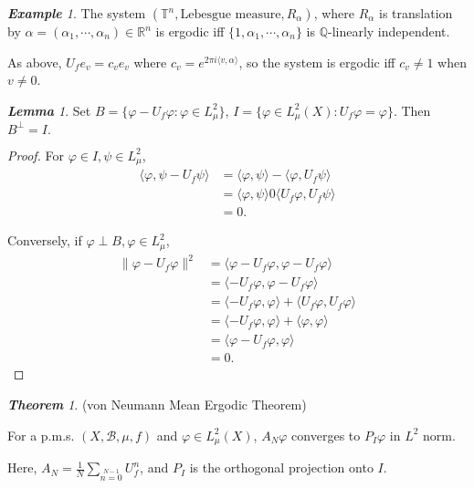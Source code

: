 \documentclass[10pt, a4paper, oneside]{report}
\numberwithin{equation}{chapter}
\theoremstyle{remark}
\newtheorem{theorem}[definition]{\bf{Theorem}}
\newtheorem{lemma}[definition]{\bf{Lemma}}
\theoremstyle{remark}
\newtheorem{example}{\bf{Example}}[chapter]
\begin{document}
\begin{example}
    The system $(\mathbb{T}^n,\text{Lebesgue measure},R_\alpha)$, where $R_\alpha$ is translation by $\alpha=(\alpha_1,\cdots,\alpha_n)\in\mathbb{R}^n$ is ergodic iff $\{1,\alpha_1,\cdots,\alpha_n\}$ is $\mathbb{Q}$-linearly independent.

    As above, $U_fe_v=c_ve_v$ where $c_v=e^{2\pi i\langle v,\alpha\rangle}$, so the system is ergodic iff $c_v\not=1$ when $v\not=0$.
\end{example}

\begin{lemma}
    Set $B=\{\varphi-U_f\varphi:\varphi\in L_\mu^2\}$, $I=\{\varphi\in L_\mu^2(X):U_f\varphi=\varphi\}$. Then $B^{\perp}=I.$
\end{lemma}

\begin{proof}
    For $\varphi\in I,\psi\in L_\mu^2$, 
    \begin{equation*}
        \begin{aligned}
            \langle \varphi,\psi-U_f\psi\rangle&=\langle\varphi,\psi\rangle-\langle\varphi,U_f\psi\rangle\\
            &=\langle \varphi,\psi\rangle0\langle U_f\varphi,U_f\psi\rangle\\
            &=0.
        \end{aligned}
    \end{equation*}

    Conversely, if $\varphi\perp B,\varphi\in L_\mu^2$,
    \begin{equation*}
        \begin{aligned}
            \|\varphi-U_f\varphi\|^2&=\langle\varphi-U_f\varphi,\varphi-U_f\varphi\rangle\\
            &=\langle -U_f\varphi,\varphi-U_f\varphi\rangle\\
            &=\langle-U_f\varphi,\varphi\rangle+\langle U_f\varphi,U_f\varphi\rangle\\
            &=\langle-U_f\varphi,\varphi\rangle+\langle \varphi,\varphi\rangle\\
            &=\langle\varphi-U_f\varphi,\varphi\rangle\\
            &=0.
        \end{aligned}
    \end{equation*}
\end{proof}

\begin{theorem}
    (von Neumann Mean Ergodic Theorem)

    For a p.m.s. $(X,\mathcal{B},\mu,f)$ and $\varphi\in L_\mu^2(X)$, $A_N\varphi$ converges to $P_I\varphi$ in $L^2$ norm.

    Here, $A_N=\frac{1}{N}\sum\limits_{n=0}\limits^{N-1}U_f^n$, and $P_I$ is the orthogonal projection onto $I$.
\end{theorem}
\end{document}
